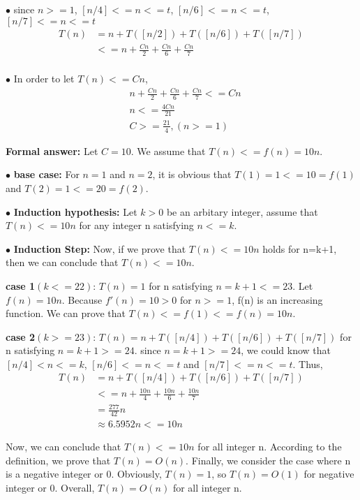 \documentclass[12pt,a4paper]{article}
\begin{document}
		$\bullet$ since $n>=1$, $[n/4]<=n<=t$, $[n/6]<=n<=t$, $[n/7]<=n<=t$
		\begin{align*}
 		T(n)&=n+T([n/2])+T([n/6])+T([n/7]) \\
		&<=n + \frac{Cn}{2}  + \frac{Cn}{6} + \frac{Cn}{7} \\
		\end{align*}


		$\bullet$ In order to let $T(n)<=Cn$,
		\begin{align*}
 		&n + \frac{Cn}{2}  + \frac{Cn}{6} + \frac{Cn}{7}<=Cn\\
		&n <=\frac{4Cn}{21}\\
		&C >=\frac{21}{4},(n>=1)
		\end{align*}
		
	\noindent
	\textbf{Formal answer:}
	{Let $C=10$.  We assume that $T(n)<=f(n)=10n$}.

		$\bullet$ \textbf{base case:}
		For $n=1$ and $n=2$, it is obvious that $T(1)=1<=10=f(1)$ and $T(2)=1<=20=f(2)$.


		$\bullet$ \textbf{Induction hypothesis:}
		Let $k>0$ be an arbitary integer, assume that $T(n)<=10n$ for any integer n satisfying $n<=k$.

		
		$\bullet$ \textbf{Induction Step:}
		Now, if we prove that $T(n)<=10n$ holds for n=k+1, then we can conclude that $T(n)<=10n$.


		
		\textbf{case 1$(k<=22)$}:
		$T(n)=1$ for n satisfying $n=k+1<=23$. Let $f(n)=10n$. Because $f'(n)=10>0$ for $n>=1$, f(n) is an increasing function. We can prove that $T(n)<=f(1)<=f(n)=10n$.

		
		\textbf{case 2$(k>=23)$}:
		$T(n)=n+T([n/4])+T([n/6])+T([n/7])$ for n satisfying $n=k+1>=24$. since $n=k+1>=24$, we could know that $[n/4]<n<=k$, $[n/6]<=n<=t$ and $[n/7]<=n<=t$. Thus, 
		\begin{align*}
 		T(n)&=n+T([n/4])+T([n/6])+T([n/7]) \\
		&<=n + \frac{10n}{4}  + \frac{10n}{6} + \frac{10n}{7}\\
		&= \frac{277}{42}n\\
		&\approx 6.5952n<=10n
		\end{align*}

		Now, we can conclude that 	$T(n)<=10n$ for all integer n. According to the definition, we prove that $T(n)=O(n)$. Finally, we consider the case where n is a negative integer or 0. Obviously, $T(n)=1$, so $T(n)=O(1)$ for negative integer or 0. Overall, $T(n)=O(n)$ for all integer n.
\end{document}
